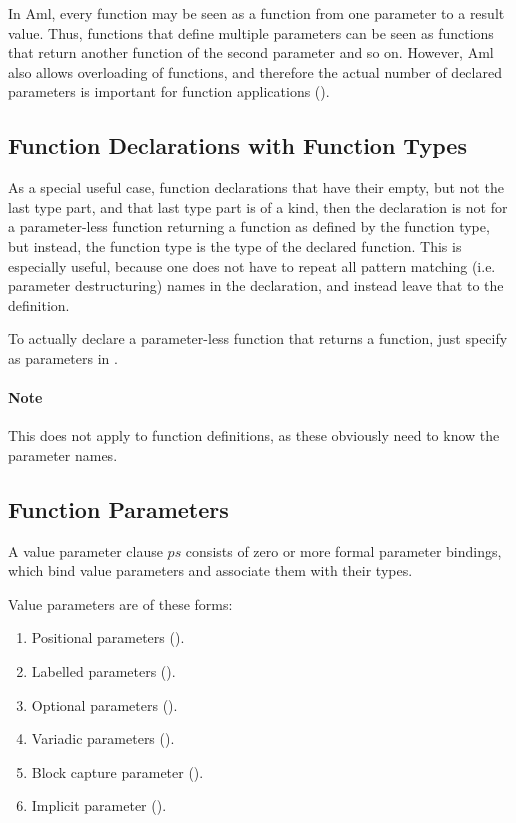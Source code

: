 In Aml, every function may be seen as a function from one parameter to a result value. Thus, functions that define multiple parameters can be seen as functions that return another function of the second parameter and so on. However, Aml also allows overloading of functions, and therefore the actual number of declared parameters is important for function applications ().





\subsection{Function Declarations with Function Types}

As a special useful case, function declarations that have their  empty, but not the last type part, and that last type part is of a  kind, then the declaration is not for a parameter-less function returning a function as defined by the function type, but instead, the function type is the type of the declared function. This is especially useful, because one does not have to repeat all pattern matching (i.e. parameter destructuring) names in the declaration, and instead leave that to the definition. 

To actually declare a parameter-less function that returns a function, just specify \code{()} as parameters in . 

\paragraph{Note}
This does not apply to function definitions, as these obviously need to know the parameter names. 





\subsection{Function Parameters}

A value parameter clause $ps$ consists of zero or more formal parameter bindings, which bind value parameters and associate them with their types. 

Value parameters are of these forms:
\begin{enumerate}
  \item Positional parameters (). 
  \item Labelled parameters (). 
  \item Optional parameters (). 
  \item Variadic parameters ().
  \item Block capture parameter ().
  \item Implicit parameter ().
\end{enumerate}

